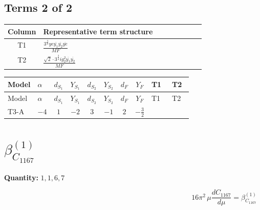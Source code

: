 \documentclass[8pt]{article}
\begin{document}
\begin{landscape}
\subsection*{Terms 2 of 2}
\begin{center}
\begin{tabular}{@{}c >{\raggedright\arraybackslash}p{0.82\linewidth}@{}}
\toprule
Column & Representative term structure \\
\midrule
T1 & \(\displaystyle \frac{3^{\frac{3}{4}} ye \overline{y_{1}} \overline{y_{2}} \overline{ye}}{MF}\) \\
\midrule
T2 & \(\displaystyle \frac{\sqrt{2} \cdot 3^{\frac{3}{4}} i g_{2}^{2} \overline{y_{1}} \overline{y_{2}}}{MF}\) \\
\midrule
\bottomrule
\end{tabular}
\end{center}
\smallskip
\tiny
\begin{longtable}{@{}llcccccc >{\raggedright\arraybackslash}p{0.21\linewidth} >{\raggedright\arraybackslash}p{0.21\linewidth}@{}}
\toprule
Model & $\alpha$ & $d_{S_1}$ & $Y_{S_1}$ & $d_{S_2}$ & $Y_{S_2}$ & $d_F$ & $Y_F$ & T1 & T2 \\
\midrule
\endfirsthead
\toprule
Model & $\alpha$ & $d_{S_1}$ & $Y_{S_1}$ & $d_{S_2}$ & $Y_{S_2}$ & $d_F$ & $Y_F$ & T1 & T2 \\
\midrule
\endhead
T3-A & $-4$ & $1$ & $-2$ & $3$ & $-1$ & $2$ & $-\frac{3}{2}$ & \scriptsize\adjustbox{max width=\linewidth}{$\begin{gathered} - \frac{3^{\frac{3}{4}} ye \overline{y_{1}} \overline{y_{2}} \overline{ye}}{12 MF}\end{gathered}$} & \scriptsize\adjustbox{max width=\linewidth}{$\begin{gathered} \frac{\sqrt{2} \cdot 3^{\frac{3}{4}} i g_{2}^{2} \overline{y_{1}} \overline{y_{2}}}{3 MF}\end{gathered}$} \\
\midrule
\bottomrule
\end{longtable}
\clearpage
\section*{$\beta_{C_{1167}}^{(1)}$}
\noindent\textbf{Quantity: }$\mathrm{1,1,6,7}$\par\smallskip
\[16\pi^2\,\mu\frac{d C_{1167}}{d\mu}=\beta_{C_{1167}}^{(1)}\]

\end{landscape}
\end{document}
